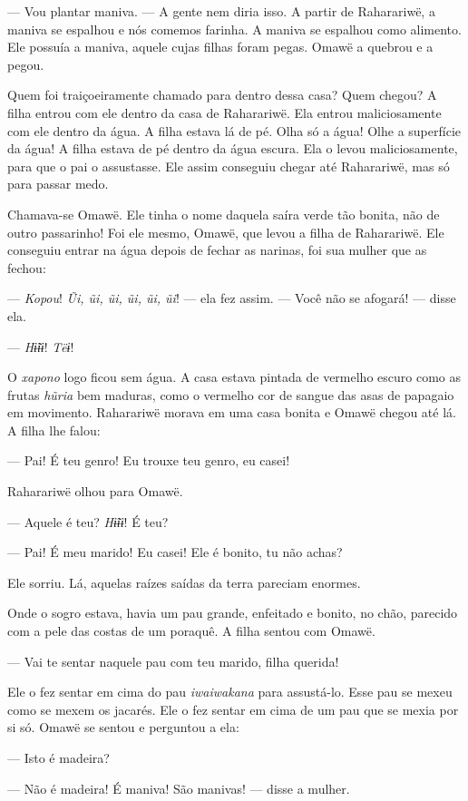 --- Vou plantar maniva. --- A gente nem diria isso. A partir de
Raharariwë, a maniva se espalhou e nós comemos farinha. A maniva se
espalhou como alimento. Ele possuía a maniva, aquele cujas filhas foram
pegas. Omawë a quebrou e a pegou.

Quem foi traiçoeiramente chamado para dentro dessa casa? Quem chegou? A
filha entrou com ele dentro da casa de Raharariwë. Ela
entrou maliciosamente com ele dentro da água. A filha estava lá de pé.
Olha só a água! Olhe a superfície da água! A filha estava de pé dentro
da água escura. Ela o levou maliciosamente, para que o pai o assustasse.
Ele assim conseguiu chegar até Raharariwë, mas só para passar medo. 

Chamava-se Omawë. Ele tinha o nome daquela saíra verde tão bonita, não
de outro passarinho! Foi ele mesmo, Omawë, que levou a filha de
Raharariwë. Ele conseguiu entrar na água depois de fechar as narinas,
foi sua mulher que as fechou:

--- \textit{Kopou}! \textit{Ũi, ũi, ũi, ũi, ũi, ũi}! --- ela fez assim. --- Você não se
afogará! --- disse ela. 

--- \textit{Hɨ̃ɨɨ}! \textit{Tëɨ}! 

O \textit{xapono} logo ficou sem água. A casa estava pintada de vermelho escuro como
as frutas \textit{hũria} bem maduras, como o vermelho cor de sangue das
asas de papagaio em movimento. Raharariwë morava em uma casa bonita e
Omawë chegou até lá. A filha lhe falou:

--- Pai! É teu genro! Eu trouxe teu genro, eu casei! 

Raharariwë olhou para Omawë. 

--- Aquele é teu? \textit{Hɨ̃ɨɨ}! É teu?

--- Pai! É meu marido! Eu casei! Ele é bonito, tu não achas? 

Ele sorriu. Lá, aquelas raízes saídas da terra pareciam enormes.

Onde o sogro estava, havia um pau grande, enfeitado e bonito, no chão,
parecido com a pele das costas de um poraquê. A filha sentou com Omawë.

--- Vai te sentar naquele pau com teu marido, filha
querida! 

Ele o fez sentar em cima do pau \textit{iwaiwakana} para assustá-lo. Esse
pau se mexeu como se mexem os jacarés. Ele o fez sentar em cima de um
pau que se mexia por si só. Omawë se sentou e perguntou a ela: 

--- Isto é madeira?

--- Não é madeira! É maniva! São manivas! --- disse a mulher. 

